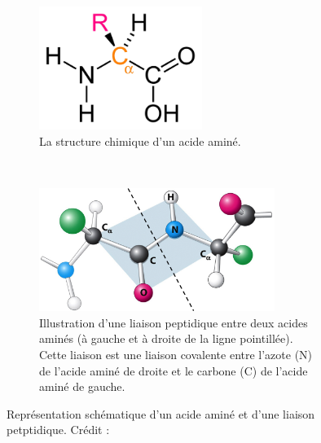 	\begin{figure}[htb]
		\begin{subfigure}{.39\textwidth}
			\centering
			\includegraphics[height=4cm]{./figures/ch1/amino_acid_structure}
			\caption{La structure chimique d'un acide aminé.}
			\label{fig:amino_acid_structure}
		\end{subfigure}
		~
		\begin{subfigure}{.59\textwidth}
			\centering
			\includegraphics[height=4cm]{./figures/ch1/peptidic_bond.png}
			\caption{Illustration d'une liaison peptidique entre deux acides aminés (à gauche et à droite de la ligne pointillée). Cette liaison est une liaison covalente entre l'azote (N) de l'acide aminé de droite et le carbone (C) de l'acide aminé de gauche.}
			\label{fig:peptide_bond}
		\end{subfigure}
		\caption[Acide aminé]{Représentation schématique d'un acide aminé et d'une liaison petptidique. Crédit :~\cite{berg_biochemistry_2012}}
		\label{fig:aminoAcid}
	\end{figure}
	
